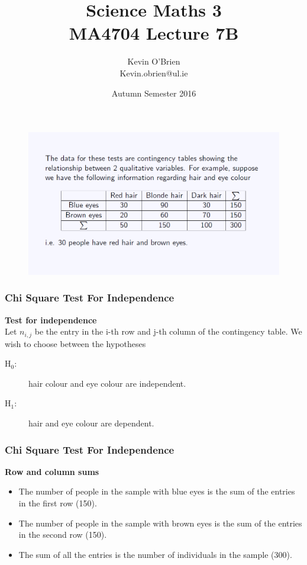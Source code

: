 \documentclass[a4]{beamer}
\title[MA4603/MA505]{Science Maths 3 \\ {\normalsize MA4704 Lecture 7B}}
\author[Kevin O'Brien]{Kevin O'Brien \\ {\scriptsize Kevin.obrien@ul.ie}}
\date{Autumn Semester 2016}
\institute[Maths \& Stats]{Dept. of Mathematics \& Statistics, \\ University \textit{of} Limerick}
\begin{document}
	
	\begin{frame}
		\titlepage
	\end{frame}
	\begin{frame}
		\begin{figure}
\centering
\includegraphics[width=1.1\linewidth]{ChiSquare1}
\end{figure}
	\end{frame}
%
%		
\begin{frame}
\frametitle{Chi Square Test For Independence}
\large
\noindent \textbf{Test for independence} \\ \bigskip
Let $n_{i,j}$ be the entry in the i-th row and j-th column of the
contingency table. We wish to choose between the hypotheses
\begin{description}
\item[H$_0$:] hair colour and eye colour are independent.
\item[H$_1$:] hair and eye colour are dependent.
\end{description}
\end{frame}
\begin{frame}
\frametitle{Chi Square Test For Independence}
\large
\noindent \textbf{Row and column sums}
\begin{itemize}
\item The number of people in the sample with blue eyes is the sum of
the entries in the first row (150).
\item The number of people in the sample with brown eyes is the sum of
the entries in the second row (150).
\item The sum of all the entries is the number of individuals in the
sample (300).
\end{itemize}
\end{frame}
\end{document}
